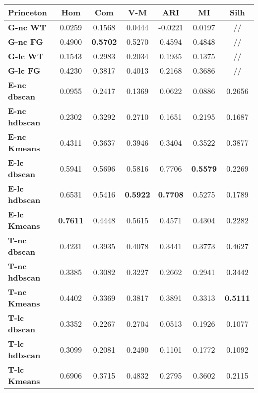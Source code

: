\begin{table}[H]
	\begin{tabular}{| l | c | c | c | c | c | c |}
	\hline
	\textbf{Princeton}  & \textbf{Hom} & \textbf{Com} & \textbf{V-M}  & \textbf{ARI}  & \textbf{MI}  & \textbf{Silh} \\ [3ex] \hline
	\textbf{G-nc WT} & 0.0259 & 0.1568 & 0.0444 & -0.0221 & 0.0197 & // \\ [2ex]
	 \hline
	\textbf{G-nc FG} & 0.4900 & \textbf{0.5702} & 0.5270 & 0.4594 & 0.4848 & // \\ [2ex]
	 \hline	
	\textbf{G-lc WT} & 0.1543 & 0.2983 & 0.2034 & 0.1935 & 0.1375 & // \\ [2ex]
	 \hline	
	\textbf{G-lc FG} & 0.4230 & 0.3817 & 0.4013 & 0.2168 & 0.3686 & // \\ [2ex]
	\hline
	
	\textbf{E-nc dbscan} & 0.0955 & 0.2417 & 0.1369 & 0.0622 & 0.0886 & 0.2656\\ [2ex]
	 \hline 
	\textbf{E-nc hdbscan} & 0.2302 & 0.3292 & 0.2710 & 0.1651 & 0.2195 & 0.1687\\ [2ex]
	 \hline
	\textbf{E-nc Kmeans} & 0.4311 & 0.3637 & 0.3946 & 0.3404 & 0.3522 & 0.3877\\ [2ex]
	 \hline	
	\textbf{E-lc dbscan} & 0.5941 & 0.5696 & 0.5816 & 0.7706 & \textbf{0.5579} & 0.2269\\ [2ex]
	\hline
	\textbf{E-lc hdbscan} & 0.6531 & 0.5416 & \textbf{0.5922} & \textbf{0.7708} & 0.5275 & 0.1789\\ [2ex]
	\hline
	\textbf{E-lc Kmeans} & \textbf{0.7611} & 0.4448 & 0.5615 & 0.4571 & 0.4304 & 0.2282\\ [2ex]
	\hline
	
	\textbf{T-nc dbscan} & 0.4231 & 0.3935 & 0.4078 & 0.3441 & 0.3773 & 0.4627\\ [2ex]
	 \hline 
	\textbf{T-nc hdbscan} & 0.3385 & 0.3082 & 0.3227 & 0.2662 & 0.2941 & 0.3442\\ [2ex]
	 \hline
	\textbf{T-nc Kmeans} & 0.4402 & 0.3369 & 0.3817 & 0.3891 & 0.3313 & \textbf{0.5111}\\ [2ex]
	 \hline	
	\textbf{T-lc dbscan} & 0.3352 & 0.2267 & 0.2704 & 0.0513 & 0.1926 & 0.1077\\ [2ex]
	\hline
	\textbf{T-lc hdbscan} & 0.3099 & 0.2081 & 0.2490 & 0.1101 & 0.1772 & 0.1092\\ [2ex]
	\hline
	\textbf{T-lc Kmeans} & 0.6906 & 0.3715 & 0.4832 & 0.2795 & 0.3602 & 0.2115\\ [2ex]
	\hline
	

\end{tabular}
\end{table}
